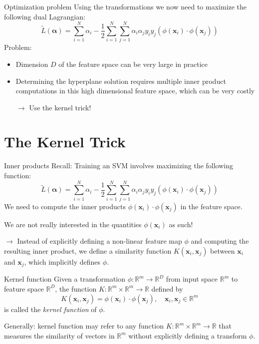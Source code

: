 \documentclass[dvipsnames]{beamer}
\begin{document}
			\begin{frame}{Optimization problem}
        Using the transformations we now need to maximize the following dual Lagrangian:
			\[
			\widetilde{L}(\boldsymbol{\alpha}) = \sum_{i=1}^N\alpha_i - \frac{1}{2}\sum_{i=1}^N\sum_{j=1}^N\alpha_i\alpha_j y_i y_j (\phi(\mathbf{x}_i) \cdot \phi(\mathbf{x}_j))
			\]
			\pause
			Problem: 
			\begin{itemize}
				\item Dimension $D$ of the feature space can be very large in practice \pause
				\item Determining the hyperplane solution requires multiple inner product computations in this high dimensional feature space, which can be very costly \pause
				\item[$\rightarrow$] Use the kernel trick!
			\end{itemize}
			\end{frame}
			
			\section{The Kernel Trick}
			\begin{frame}{Inner products}
        Recall: Training an SVM involves maximizing the following function:
			\[
			\widetilde{L}(\boldsymbol{\alpha}) = \sum_{i=1}^N\alpha_i - \frac{1}{2}\sum_{i=1}^N\sum_{j=1}^N\alpha_i\alpha_j y_i y_j (\phi(\mathbf{x}_i) \cdot \phi(\mathbf{x}_j))
			\]
			\pause
			We need to compute the inner products $\phi(\mathbf{x}_i) \cdot \phi(\mathbf{x}_j)$ in the feature space. \pause
			
			We are not really interested in the quantities $\phi(\mathbf{x}_i)$ as such! \pause
			
			$\rightarrow$ Instead of explicitly defining a non-linear feature map $\phi$ and computing the resulting inner product, we define a similarity function $K(\mathbf{x}_i,\mathbf{x}_j) $ between $\mathbf{x}_i$ and $\mathbf{x}_j$, which implicitly defines $\phi$.
			\end{frame}
			
			\begin{frame}{Kernel function}
        Given a transformation $\phi:\mathbb{R}^m \rightarrow \mathbb{R}^{D}$ from input space $\mathbb{R}^m$ to feature space $\mathbb{R}^D$, the function $K:\mathbb{R}^m \times \mathbb{R}^m \rightarrow \mathbb{R}$ defined by
				\[
				K(\mathbf{x}_i,\mathbf{x}_j) = \phi(\mathbf{x}_i)\cdot \phi(\mathbf{x}_j),\quad \mathbf{x}_i,\mathbf{x}_j \in \mathbb{R}^{m}
				\]
				is called the \emph{kernel function} of $\phi$. \pause
				
				Generally: kernel function may refer to any function $K:\mathbb{R}^m \times \mathbb{R}^m \rightarrow \mathbb{R}$ that measures the similarity of vectors in $\mathbb{R}^m$ without explicitly defining a transform $\phi$.
			\end{frame}
			
\end{document}
